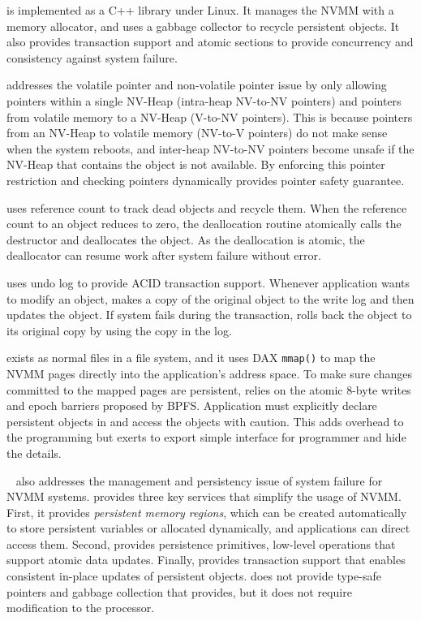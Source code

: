 \nvh{} is implemented as a C++ library under Linux. It manages
the NVMM with a memory allocator, and uses a gabbage collector to recycle
persistent objects. It also provides transaction support and atomic sections 
to provide concurrency and consistency against system failure.

\nvh{} addresses the volatile pointer and non-volatile pointer issue by
only allowing pointers within a single NV-Heap (intra-heap NV-to-NV pointers)
and pointers from volatile memory to a NV-Heap (V-to-NV pointers). This is
because pointers from an NV-Heap to volatile memory (NV-to-V pointers) do
not make sense when the system reboots, and inter-heap NV-to-NV pointers become
unsafe if the NV-Heap that contains the object is not available. By enforcing
this pointer restriction and checking pointers dynamically \nvh{} provides
pointer safety guarantee.

\nvh{} uses reference count to track dead objects and recycle them. When 
the reference count to an object reduces to zero, the deallocation routine 
atomically calls the destructor and deallocates the object. As the deallocation
is atomic, the deallocator can resume work after system failure without error.

\nvh{} uses undo log to provide ACID transaction support. Whenever application
wants to modify an object, \nvh{} makes a copy of the original object to
the write log and then updates the object. If system fails during
the transaction, \nvh{} rolls back the object to its original copy by using
the copy in the log.

\nvh{} exists as normal files in a file system, and it uses DAX
\texttt{mmap()} to map the NVMM pages directly into the application's
address space. To make sure changes committed to the mapped pages are
persistent, \nvh{} relies on the atomic 8-byte writes and epoch barriers
proposed by BPFS.
 Application must explicitly declare persistent objects in
\nvh{} and access the objects with caution. This adds overhead to the
programming but \nvh{} exerts to export simple interface for programmer
and hide the details.

\textbf{\mnem{}}~\cite{mnemosyne}
 also addresses the management and persistency issue
of system failure for NVMM systems. \mnem{} provides three key services
that simplify the usage of NVMM. First, it provides \emph{persistent
memory regions}, which can be created automatically to store persistent 
variables or allocated dynamically, and applications can direct access them.
Second, \mnem{} provides persistence
primitives, low-level operations that support atomic data updates. Finally,
\mnem{} provides transaction support that enables consistent in-place
updates of persistent objects. \mnem{} does not provide type-safe pointers
and gabbage collection that \nvh{} provides, but it does not require
modification to the processor.

